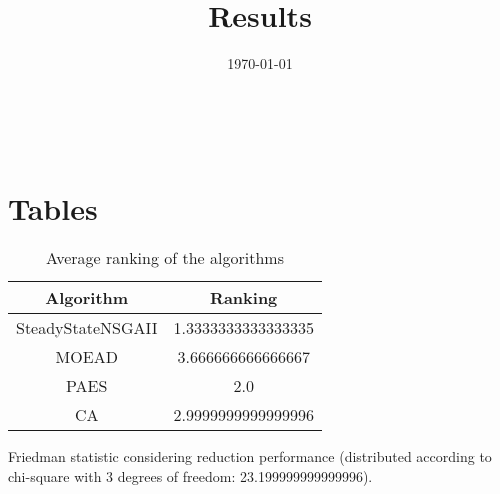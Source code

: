 \documentclass{article}
\title{Results}
\author{}
\date{\today}
\begin{document}
\oddsidemargin 0in \topmargin 0in\maketitle
\
\section{Tables}
\begin{table}[!htp]
\centering
\caption{Average ranking of the algorithms}
\begin{tabular}{c|c}
Algorithm&Ranking\\
\hline
SteadyStateNSGAII&1.3333333333333335\\
MOEAD&3.666666666666667\\
PAES&2.0\\
CA&2.9999999999999996\\
\end{tabular}
\end{table}


Friedman statistic considering reduction performance (distributed according to chi-square with 3 degrees of freedom: 23.199999999999996).
\end{document}
